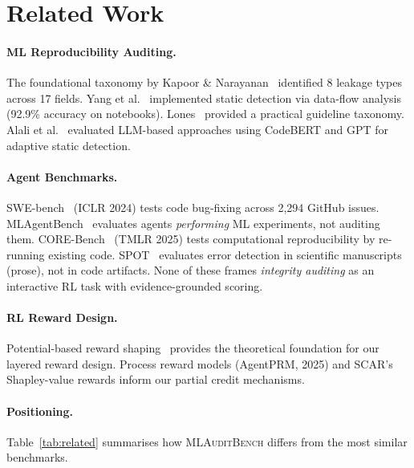 \documentclass{article}
\begin{document}
\section{Related Work}
\label{sec:related}

\paragraph{ML Reproducibility Auditing.}
The foundational taxonomy by Kapoor \& Narayanan~\cite{kapoor2023leakage}
identified 8 leakage types across 17 fields.  Yang et al.~\cite{yang2022data}
implemented static detection via data-flow analysis (92.9\% accuracy on
notebooks).  Lones~\cite{lones2021avoid} provided a practical guideline
taxonomy.  Alali et al.~\cite{alali2025llmleakage} evaluated LLM-based approaches using
CodeBERT and GPT for adaptive static detection.

\paragraph{Agent Benchmarks.}
SWE-bench~\cite{jimenez2024swebench} (ICLR 2024) tests code bug-fixing across 2,294 GitHub issues.
MLAgentBench~\cite{huang2024mlagentbench} evaluates agents \emph{performing} ML experiments, not auditing them.
CORE-Bench~\cite{kapoor2024corebench} (TMLR 2025) tests computational reproducibility by re-running existing code.
SPOT~\cite{spot2025} evaluates error detection in scientific manuscripts (prose), not in code artifacts.
None of these frames \emph{integrity auditing} as an interactive RL task with evidence-grounded scoring.

\paragraph{RL Reward Design.}
Potential-based reward shaping~\cite{ng1999policy} provides the theoretical
foundation for our layered reward design.  Process reward models
(AgentPRM, 2025) and SCAR's Shapley-value rewards inform our partial
credit mechanisms.

\paragraph{Positioning.}
Table~\ref{tab:related} summarises how \textsc{MLAuditBench} differs from
the most similar benchmarks.
\end{document}
